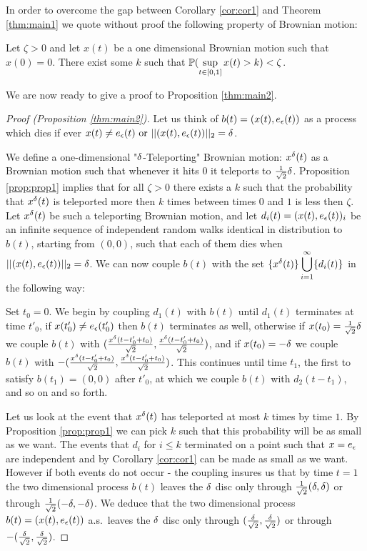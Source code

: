 {In order to overcome the gap between Corollary \ref{cor:cor1} and
Theorem \ref{thm:main1} we quote without proof the following property of Brownian
motion:
\begin{propos}\label{prop:prop1}
Let $\zeta>0$ and let $x(t)$ be a one dimensional Brownian
motion such that $x(0)=0$. There exist some $k$ such that
$\mathbb{P}(\displaystyle\sup_{t\in[0,1]}x(t)>k) <\zeta$.
\end{propos}

We are now ready to give a proof to Proposition \ref{thm:main2}.

\begin{proof}[Proof (Proposition \ref{thm:main2})]
\newcommand{\hitradius}[1]{\twonorm{\twodproc{#1}}=\radius}

Let us think of $b(t)=(x(t), e_\epsilon(t))$ as a process which dies if ever $x(t)\neq e_\epsilon(t)
\text{ or } ||(x(t), e_\epsilon(t))||_2 = \delta$.

We define a one-dimensional "$\delta$-Teleporting" Brownian motion: $x^{\delta}(t)$
 as a Brownian motion such that whenever it hits $0$ it teleports to $\frac1{\sqrt{2}}\delta$.
Proposition \ref{prop:prop1} implies that for all $\zeta>0$ there exists a $k$ such that the probability
that $x^{\delta}(t)$ is teleported more then $k$ times between times $0$ and $1$ is less then $\zeta$. Let $x^{\delta}(t)$ be such a teleporting Brownian motion, and let
 $d_i(t)=(x(t), e_\epsilon(t))_i$ be an infinite sequence
 of independent random walks identical in distribution to $b(t)$, starting from $(0,0)$, such that each
 of them dies when $||(x(t), e_\epsilon(t))||_2 = \delta$. We can now couple $b(t)$ with the set $\{x^\delta(t)\}\displaystyle\bigcup_{i=1}^\infty\{d_i(t)\}$ in the following way:

Set $t_0=0$. We begin by coupling $d_1(t)$ with $b(t)$ until $d_1(t)$ terminates at
time $t'_0$, if $x(t'_0)\neq e_\epsilon(t'_0)$ then $b(t)$ terminates as well, otherwise
 if $x(t_0)=\frac1{\sqrt{2}}\delta$ we couple $b(t)$ with $(\frac{x^\delta(t-t'_0+t_0)}{\sqrt{2}},\frac{x^\delta(t-t'_0+t_0)}{\sqrt{2}})$,
  and if $x(t_0)=-\delta$ we couple $b(t)$ with $-(\frac{x^\delta(t-t'_0+t_0)}{\sqrt{2}},\frac{x^\delta(t-t'_0+t_0)}{\sqrt{2}})$.
 This continues until time $t_1$, the first to satisfy $b(t_1)=(0,0)$ after $t'_0$,
 at which we couple $b(t)$ with $d_2(t-t_1)$, and so on and so forth.

Let us look at the event that $x^\delta(t)$ has teleported at most $k$ times by time $1$.
 By Proposition \ref{prop:prop1} we can pick $k$ such that this probability will be as small
 as we want. The events that $d_i$ for $i\le k$ terminated on a point such that $x=e_\epsilon$
 are independent and by Corollary \ref{cor:cor1} can be made as small as we want. However
  if both events do not occur - the coupling insures us that by time $t=1$ the two
   dimensional process $b(t)$
leaves the $\delta$ disc only through
$\frac1{\sqrt2}(\delta,\delta)$ or through
$\frac1{\sqrt2}(-\delta,-\delta)$. We deduce that the two dimensional process $b(t)=(x(t), e_\epsilon(t))$
a.s.\ leaves the $\delta$ disc only through $(\frac{\delta}{\sqrt2},\frac{\delta}{\sqrt2})$ or through $-(\frac{\delta}{\sqrt2},\frac{\delta}{\sqrt2})$.


\end{proof}}
